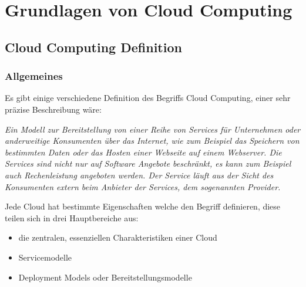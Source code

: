 \chapter{Grundlagen von Cloud Computing}
\putz


\section{Cloud Computing Definition}
\subsection{Allgemeines}
Es gibt einige verschiedene Definition des Begriffs Cloud Computing, einer sehr präzise Beschreibung wäre:

\begin{center}
   \textit{Ein Modell zur Bereitstellung von einer Reihe von Services für Unternehmen oder anderweitige Konsumenten über das Internet, wie zum Beispiel das
	Speichern von bestimmten Daten oder das Hosten einer Webseite auf einem Webserver. Die Services sind nicht nur auf Software Angebote beschränkt, es kann zum Beispiel auch Rechenleistung
	angeboten werden. Der Service läuft aus der Sicht des Konsumenten extern beim Anbieter der Services, dem sogenannten Provider.}
\end{center}

Jede Cloud hat bestimmte Eigenschaften welche den Begriff definieren, diese teilen sich in drei Hauptbereiche aus:
\begin{itemize}
	\item die zentralen, essenziellen Charakteristiken einer Cloud
	\item Servicemodelle
	\item Deployment Models oder Bereitstellungsmodelle
\end{itemize}


